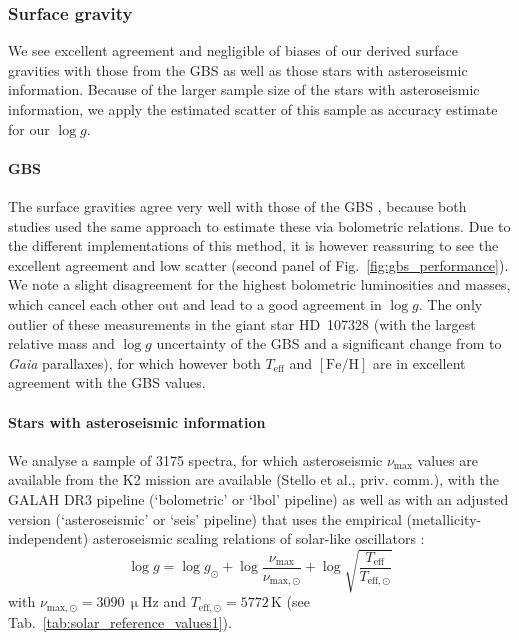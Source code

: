 \documentclass[fleqn,usenatbib,useAMS]{mnras}
\newcommand{\Teff}{$T_\mathrm{eff}$\xspace}
\newcommand{\logg}{$\log g$\xspace}
\newcommand{\feh}{$\mathrm{[Fe/H]}$\xspace}
\newcommand{\numax}{$\nu_\mathrm{max}$\xspace}
\newcommand{\Gaia}{\textit{Gaia}\xspace}
\newcommand{\Hipparcos}{{\sc{Hipparcos}}\xspace}
\begin{document}
\subsubsection{Surface gravity}

We see excellent agreement and negligible of biases of our derived surface gravities with those from the GBS as well as those stars with asteroseismic information. Because of the larger sample size of the stars with asteroseismic information, we apply the estimated scatter of this sample as accuracy estimate for our \logg.

\paragraph*{GBS}

The surface gravities agree very well with those of the GBS \citep{Heiter2015, Jofre2018a}, because both studies used the same approach to estimate these via bolometric relations. Due to the different implementations of this method, it is however reassuring to see the excellent agreement and low scatter (second panel of Fig.~\ref{fig:gbs_performance}). We note a slight disagreement for the highest bolometric luminosities and masses, which cancel each other out and lead to a good agreement in \logg. The only outlier of these measurements in the giant star HD~107328 (with the largest relative mass and \logg uncertainty of the GBS and a significant change from \Hipparcos to \Gaia parallaxes), for which however both \Teff and \feh are in excellent agreement with the GBS values.

\paragraph*{Stars with asteroseismic information}

We analyse a sample of 3175 spectra, for which asteroseismic \numax values are available from the K2 mission are available (Stello et al., priv. comm.), with the GALAH DR3 pipeline (`bolometric' or `lbol' pipeline) as well as with an adjusted version (`asteroseismic' or `seis' pipeline) that uses the empirical (metallicity-independent) asteroseismic scaling relations of solar-like oscillators \citep[see e.g.][]{Kjeldsen1995, Bedding2010}:
\begin{equation}
\log g = \log g_\odot + \log \frac{\nu_\mathrm{max}}{\nu_\mathrm{max,\odot}} + \log \sqrt{\frac{T_\mathrm{eff}}{T_\mathrm{eff,\odot}}}
\end{equation}
with $\nu_\mathrm{max,\odot} = 3090\,\mathrm{\upmu Hz}$ \citep{Huber2017} and $T_\mathrm{eff,\odot} = 5772\,\mathrm{K}$ (see Tab.~\ref{tab:solar_reference_values1}).
\end{document}
